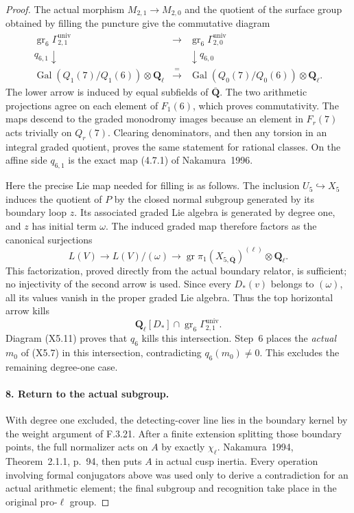 \begin{proof}
The actual morphism $M_{2,1}\to M_{2,0}$ and the quotient
of the surface group obtained by filling the puncture
give the commutative diagram
\[
\begin{array}{ccc}
 \operatorname{gr}_6\Gamma^{\mathrm{univ}}_{2,1}
 &\longrightarrow&
 \operatorname{gr}_6\Gamma^{\mathrm{univ}}_{2,0}\\
 q_{6,1}\downarrow&&\downarrow q_{6,0}\\
 \operatorname{Gal}(Q_1(7)/Q_1(6))\otimes\mathbf Q_\ell
 &\xrightarrow{\ =\ }&
 \operatorname{Gal}(Q_0(7)/Q_0(6))\otimes\mathbf Q_\ell.
\end{array}
\tag{X5.11}
\]
The lower arrow is induced by equal subfields of
$\overline{\mathbf Q}$. The two arithmetic projections
agree on each element of $F_1(6)$, which proves
commutativity. The maps descend to the graded monodromy
images because an element in $F_r(7)$ acts trivially on
$Q_r(7)$. Clearing denominators, and then any torsion in
an integral graded quotient, proves the same statement
for rational classes. On the affine side $q_{6,1}$ is
the exact map (4.7.1) of Nakamura~1996.

Here the precise Lie map needed for filling is as follows.
The inclusion $U_5\hookrightarrow X_5$ induces the quotient
of $P$ by the closed normal subgroup generated by its
boundary loop $z$. Its associated graded Lie algebra is
generated by degree one, and $z$ has initial term
$\omega$. The induced graded map therefore factors as
the canonical surjections
\[
 L(V)\longrightarrow L(V)/(\omega)
       \longrightarrow
 \operatorname{gr}\pi_1(X_{5,\overline{\mathbf Q}})^{(\ell)}
       \otimes\mathbf Q_\ell.
\]
This factorization, proved directly from the actual
boundary relator, is sufficient; no injectivity of the
second arrow is used. Since every $D_*(v)$ belongs to
$(\omega)$, all its values vanish in the proper graded
Lie algebra. Thus the top horizontal arrow kills
\[
 \mathbf Q_\ell[D_*]\cap
     \operatorname{gr}_6\Gamma^{\mathrm{univ}}_{2,1}.
\]
Diagram (X5.11) proves that $q_6$ kills this intersection.
Step~6 places the \emph{actual} $m_0$ of (X5.7) in this
intersection, contradicting $q_6(m_0)\ne0$.
This excludes the remaining degree-one case.

\paragraph{8. Return to the actual subgroup.}
With degree one excluded, the detecting-cover line lies
in the boundary kernel by the weight argument of F.3.21.
After a finite extension splitting those boundary points,
the full normalizer acts on $A$ by exactly $\chi_\ell$.
Nakamura~1994, Theorem~2.1.1, p.~94, then puts $A$ in\cite{AuditNakamura1994}
actual cusp inertia. Every operation involving formal
conjugators above was used only to derive a contradiction
for an actual arithmetic element; the final subgroup and
recognition take place in the original pro-$\ell$ group.


\end{proof}
